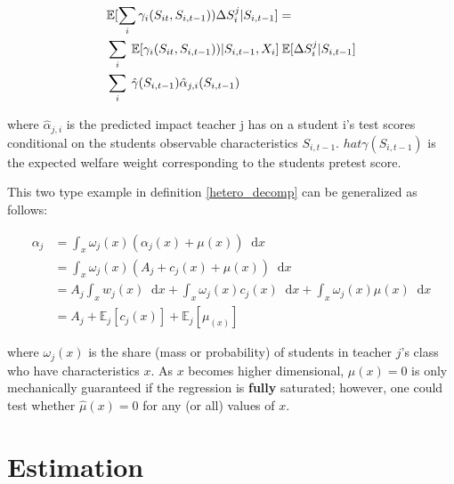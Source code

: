 \documentclass[12pt]{article}
\theoremstyle{definition}
\theoremstyle{definition}
\theoremstyle{definition}
\theoremstyle{definition}
\newcommand*\diff{\mathop{}\!\mathrm{d}}
\begin{document}
        \begin{align}
           & \mathbb{E}[\sum_i \gamma_i(S_{it}, S_{i,t-1})) \Delta S_i^j| S_{i,t-1}] = \\ 
           & \sum_i \: \mathbb{E}[\gamma_i(S_{it}, S_{i,t-1}))|S_{i,t-1}, X_i] \:\mathbb{E}[\Delta S_i^j|S_{i,t-1}] \\
           & \sum_i \: \hat{\gamma}(S_{i,t-1}) \hat{\alpha}_{j,i}(S_{i,t-1})
        \end{align}


    where $\hat{\alpha}_{j,i}$ is the predicted impact teacher j has on a student i's test scores conditional on the students observable characteristics $S_{i,t-1}$. $hat{\gamma}(S_{i,t-1})$ is the expected welfare weight corresponding to the students pretest score. 

    
    This two type example in definition \ref{hetero_decomp} can be generalized as follows: 

    \begin{align*}
                 \alpha_j  &= \int_x \omega_j(x)(\alpha_j(x) + \mu(x)) \diff x \\
                  &= \int_x \omega_j(x)(A_j + c_j(x) + \mu(x)) \diff x \\
                  &= A_j \int_x w_j(x) \diff x + \int_x \omega_j(x) c_j(x)\diff x + \int_x \omega_j(x) \mu(x)\diff x \\
                  &= A_j  + \mathbb{E}_j[c_j(x)] + \mathbb{E}_j[\mu_(x)] 
    \end{align*}

    
    \noindent where $\omega_j(x)$ is the share (mass or probability) of students in teacher $j$'s class who have characteristics $x$. As $x$ becomes higher dimensional, $\mu(x)=0$ is only mechanically guaranteed if the regression is \textbf{fully} saturated; however, one could test whether $\hat{\mu}(x)=0$ for any (or all) values of $x$.



\section{Estimation}
\label{estimation_section}
\end{document}
